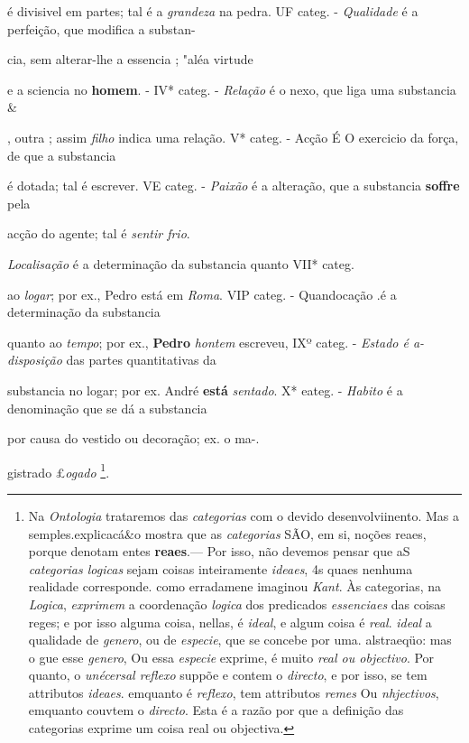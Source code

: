 é divisivel em partes; tal é a \emph{grandeza} na pedra. UF categ. - \emph{Qualidade} é a perfeição, que modifica a substan-

cia, sem alterar-lhe a essencia ; "aléa virtude

e a sciencia no \textbf{homem}. - IV* categ. - \emph{Relação} é o nexo, que liga uma substancia \&

, outra ; assim \emph{filho} indica uma relação. V* categ. \textbar{} - Acção É O exercicio da força, de que a substancia

é dotada; tal é escrever. VE categ. - \emph{Paixão} é a alteração, que a substancia \textbf{soffre} pela

acção do agente; tal é \emph{sentir frio}.

\emph{Localisação} é a determinação da substancia quanto VII* categ.

ao \emph{logar}; por ex., Pedro está em \emph{Roma}. VIP categ. - Quandocação .é a determinação da substancia

quanto ao \emph{tempo}; por ex., \textbf{Pedro} \emph{hontem} escreveu, IXº categ. - \emph{Estado é a-disposição} das partes quantitativas da

substancia no logar; por ex. André \textbf{está} \emph{sentado}. X* eateg. - \emph{Habito} é a denominação que se dá a substancia

por causa do vestido ou decoração; ex. o ma-.

gistrado £\emph{ogado} \footnote{Na \emph{Ontologia} trataremos das \emph{categorias} com o devido desenvolviinento. Mas a semples.explicacá\&o mostra que as \emph{categorias} SÃO, em si, noções reaes, porque denotam entes \textbf{reaes}.--- Por isso, não devemos pensar que aS \emph{categorias logicas} sejam coisas inteiramente \emph{ideaes}, 4s quaes nenhuma realidade corresponde. como erradamene imaginou \emph{Kant}. Às categorias, na \emph{Logica}, \emph{exprimem} a coordenação \emph{logica} dos predicados \emph{essenciaes} das coisas reges; e por isso alguma coisa, nellas, é \emph{ideal}, e algum coisa é \emph{real}. \textbar{} \emph{ideal} a qualidade de \emph{genero}, ou de \emph{especie}, que se concebe por uma. alstraeqüo: mas o gue esse \emph{genero}, Ou essa \emph{especie} exprime, é muito \emph{real ou objectivo}. Por quanto, o \emph{unécersal reflexo} suppõe e contem o \emph{directo}, e por isso, se tem attributos \emph{ideaes}. emquanto é \emph{reflexo}, tem attributos \emph{remes} Ou \emph{nhjectivos}, emquanto couvtem o \emph{directo}. Esta é a razão por que a definição das categorias exprime um coisa real ou objectiva.}.

